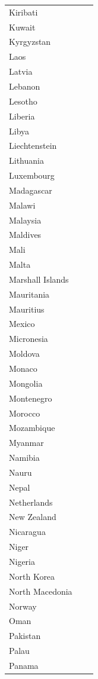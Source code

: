 \documentclass{clgrammar}
\begin{document}
\begin{longtable}{lll}
	Kiribati &  &  \\
	Kuwait &  &  \\
	Kyrgyzstan &  &  \\
	Laos &  &  \\
	Latvia &  &  \\
	Lebanon &  &  \\
	Lesotho &  &  \\
	Liberia &  &  \\
	Libya &  &  \\
	Liechtenstein &  &  \\
	Lithuania &  &  \\
	Luxembourg &  &  \\
	Madagascar &  &  \\
	Malawi &  &  \\
	Malaysia &  &  \\
	Maldives &  &  \\
	Mali &  &  \\
	Malta &  &  \\
	Marshall Islands &  &  \\
	Mauritania &  &  \\
	Mauritius &  &  \\
	Mexico &  &  \\
	Micronesia &  &  \\
	Moldova &  &  \\
	Monaco &  &  \\
	Mongolia &  &  \\
	Montenegro &  &  \\
	Morocco &  &  \\
	Mozambique &  &  \\
	Myanmar &  &  \\
	Namibia &  &  \\
	Nauru &  &  \\
	Nepal &  &  \\
	Netherlands &  &  \\
	New Zealand &  &  \\
	Nicaragua &  &  \\
	Niger &  &  \\
	Nigeria &  &  \\
	North Korea &  &  \\
	North Macedonia &  &  \\
	Norway &  &  \\
	Oman &  &  \\
	Pakistan &  &  \\
	Palau &  &  \\
	Panama &  &  \\

\end{longtable}
\end{document}
